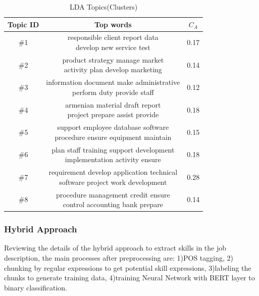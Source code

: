 \begin{table}[htbp]
\centering
\begin{tabular}{|c|c|c|}
\hline
Topic ID & Top words & $C_A$\\
\hline
\#1 & \tabincell{l}{responsible client report data \\develop new service test} & 0.17\\
\hline
\#2 & \tabincell{l}{product strategy manage market \\activity plan develop marketing} & 0.14 \\
\hline
\#3 & \tabincell{l}{information document make administrative \\perform duty provide staff} & 0.12\\
\hline
\#4 & \tabincell{l}{armenian material draft report \\project prepare assist provide} & 0.18\\
\hline
\#5 & \tabincell{l}{support employee database software \\procedure ensure equipment maintain} & 0.15 \\
\hline
\#6 & \tabincell{l}{plan staff training support development\\ implementation activity ensure} & 0.18\\
\hline
\#7 & \tabincell{l}{requirement develop application technical \\software project work development} & 0.28\\
\hline
\#8 & \tabincell{l}{procedure management credit ensure \\control accounting bank prepare} & 0.14\\
\hline
\end{tabular}
\caption{LDA Topics(Clusters)}
\label{tbl:3}
\end{table}


\subsubsection{Hybrid Approach}
\label{sec:bert}

Reviewing the details of the hybrid approach to extract skills in the job description, the main processes after preprocessing are: 1)POS tagging, 2) chunking by regular expressions to get potential skill expressions, 3)labeling the chunks to generate training data, 4)training Neural Network with BERT layer to binary classification.

